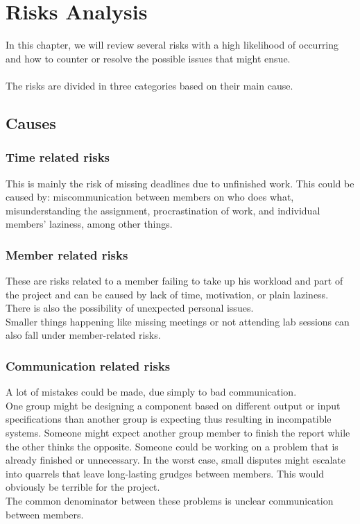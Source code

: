 \chapter{Risks Analysis }
In this chapter, we will review several risks with a high likelihood of occurring and how to counter or resolve the possible issues that might ensue.\\
\\
The risks are divided in three categories based on their main cause.
\section{Causes}
\subsection{Time related risks}
This is mainly the risk of missing deadlines due to unfinished work. This could be caused by: miscommunication between members on who does what, misunderstanding the assignment, procrastination of work, and individual members' laziness, among other things.
\subsection{Member related risks}
These are risks related to a member failing to take up his workload and part of the project and can be caused by lack of time, motivation, or plain laziness.\\
There is also the possibility of unexpected personal issues.\\
Smaller things happening like missing meetings or not attending lab sessions can also fall under member-related risks.
\subsection{Communication related risks}
A lot of mistakes could be made, due simply to bad communication.\\
One group might be designing a component based on different output or input specifications than another group is expecting thus resulting in incompatible systems. Someone might expect another group member to finish the report while the other thinks the opposite. Someone could be working on a problem that is already finished or unnecessary. In the worst case, small disputes might escalate into quarrels that leave long-lasting grudges between members. This would obviously be terrible for the project.\\
The common denominator between these problems is unclear communication between members.
